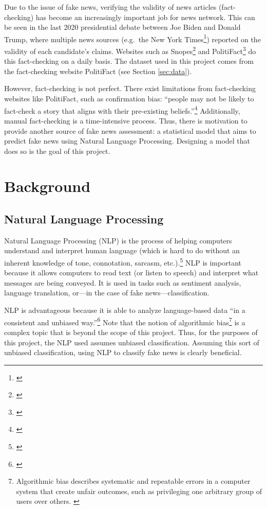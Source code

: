 \documentclass[12pt]{article}
\begin{document}
Due to the issue of fake news, verifying the validity of news articles
(fact-checking) has become an increasingly important job for news
network. This can be seen in the last 2020 presidential debate between
Joe Biden and Donald Trump, where multiple news sources (e.g.~the New
York Times\footnote{\citet{shearFactCheckingFinalPresidential2020}})
reported on the validity of each candidate's claims. Websites such as
Snopes\footnote{\citet{Snopes}} and PolitiFact\footnote{\citet{PolitiFact}}
do this fact-checking on a daily basis. The dataset used in this project
comes from the fact-checking website PolitiFact (see Section
\ref{sec:data}).

However, fact-checking is not perfect. There exist limitations from
fact-checking websites like PolitiFact, such as confirmation bias:
``people may not be likely to fact-check a story that aligns with their
pre-existing beliefs.''\footnote{\citet{asrBigDataQuality2019}}
Additionally, manual fact-checking is a time-intensive process. Thus,
there is motivation to provide another source of fake news assessment: a
statistical model that aims to predict fake news using Natural Language
Processing. Designing a model that does so is the goal of this project.

\hypertarget{background}{%
\section{Background}\label{background}}

\hypertarget{natural-language-processing}{%
\subsection{Natural Language
Processing}\label{natural-language-processing}}

Natural Language Processing (NLP) is the process of helping computers
understand and interpret human language (which is hard to do without an
inherent knowledge of tone, connotation, sarcasm, etc.).\footnote{\citet{cybiantNaturalLanguageProcessing}}
NLP is important because it allows computers to read text (or listen to
speech) and interpret what messages are being conveyed. It is used in
tasks such as sentiment analysis, language translation, or---in the case
of fake news---classification.

NLP is advantageous because it is able to analyze language-based data
``in a consistent and unbiased way.''\footnote{\citet{WhatNaturalLanguage}}
Note that the notion of algorithmic bias\footnote{Algorithmic bias
  describes systematic and repeatable errors in a computer system that
  create unfair outcomes, such as privileging one arbitrary group of
  users over others. \citet{AlgorithmicBias2020}} is a complex topic
that is beyond the scope of this project. Thus, for the purposes of this
project, the NLP used assumes unbiased classification. Assuming this
sort of unbiased classification, using NLP to classify fake news is
clearly beneficial.
\end{document}
